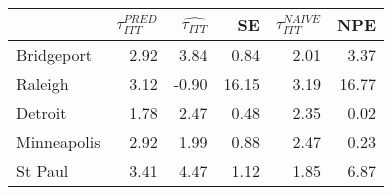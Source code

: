 
\begin{tabular}{lrrrrr}
\toprule
  & $\tau_{ITT}^{PRED}$ & $\hat{\tau_{ITT}}$ & SE & $\tau_{ITT}^{NAIVE}$ & NPE\\
\midrule
Bridgeport & 2.92 & 3.84 & 0.84 & 2.01 & 3.37\\
Raleigh & 3.12 & -0.90 & 16.15 & 3.19 & 16.77\\
Detroit & 1.78 & 2.47 & 0.48 & 2.35 & 0.02\\
Minneapolis & 2.92 & 1.99 & 0.88 & 2.47 & 0.23\\
St Paul & 3.41 & 4.47 & 1.12 & 1.85 & 6.87\\
\bottomrule
\end{tabular}